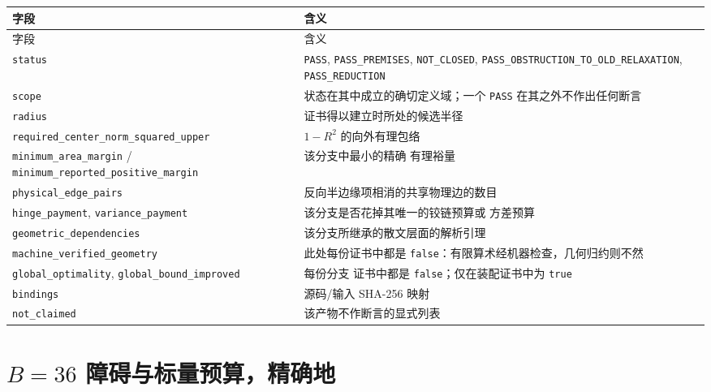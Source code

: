 {\footnotesize
\begin{longtable}{@{}@{}>{\raggedright\arraybackslash}p{}>{\raggedright\arraybackslash}p{}@{}}
\toprule
字段 & 含义 \\
\midrule
\endfirsthead
\toprule
字段 & 含义 \\
\midrule
\endhead
\bottomrule
\endlastfoot
\texttt{status} & \texttt{PASS}, \texttt{PASS\_\allowbreak{}PREMISES}, \texttt{NOT\_\allowbreak{}CLOSED},
\texttt{PASS\_\allowbreak{}OBSTRUCTION\_\allowbreak{}TO\_\allowbreak{}OLD\_\allowbreak{}RELAXATION}, \texttt{PASS\_\allowbreak{}REDUCTION} \\
\texttt{scope} & 状态在其中成立的确切定义域；一个 \texttt{PASS} 在其之外不作出任何断言 \\
\texttt{radius} & 证书得以建立时所处的候选半径 \\
\texttt{required\_\allowbreak{}center\_\allowbreak{}norm\_\allowbreak{}squared\_\allowbreak{}upper} & $1-R^2$ 的向外有理包络 \\
\texttt{minimum\_\allowbreak{}area\_\allowbreak{}margin} / \texttt{minimum\_\allowbreak{}reported\_\allowbreak{}positive\_\allowbreak{}margin} & 该分支中最小的精确
有理裕量 \\
\texttt{physical\_\allowbreak{}edge\_\allowbreak{}pairs} & 反向半边缘项相消的共享物理边的数目 \\
\texttt{hinge\_\allowbreak{}payment}, \texttt{variance\_\allowbreak{}payment} & 该分支是否花掉其唯一的铰链预算或
方差预算 \\
\texttt{geometric\_\allowbreak{}dependencies} & 该分支所继承的散文层面的解析引理 \\
\texttt{machine\_\allowbreak{}verified\_\allowbreak{}geometry} & 此处每份证书中都是 \texttt{false}：有限算术经机器检查，几何归约则不然 \\
\texttt{global\_\allowbreak{}optimality}, \texttt{global\_\allowbreak{}bound\_\allowbreak{}improved} & 每份分支
证书中都是 \texttt{false}；仅在装配证书中为 \texttt{true} \\
\texttt{bindings} & 源码/输入 SHA-256 映射 \\
\texttt{not\_\allowbreak{}claimed} & 该产物不作断言的显式列表 \\
\end{longtable}}


\section{$B=36$ 障碍与标量预算，精确地}
\label{app:budget}
\label{sec:budget-recheck}

